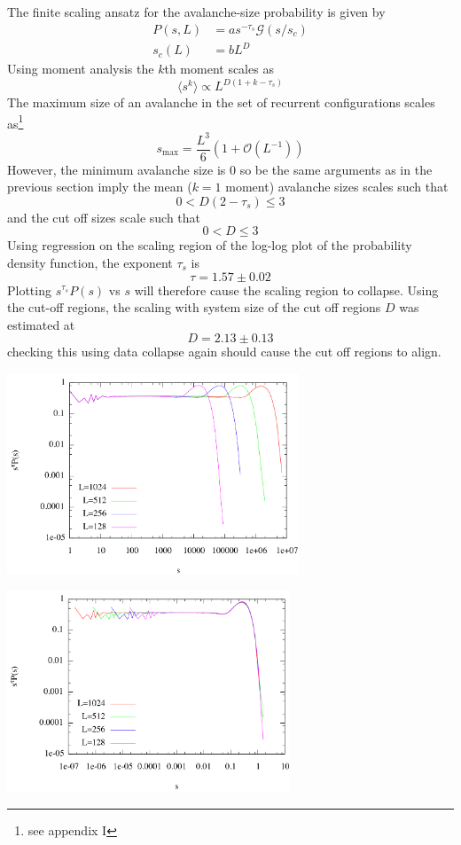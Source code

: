 \documentclass[twoside]{article}
\begin{document}
The finite scaling ansatz for the avalanche-size probability is given by 
\begin{align*}
P(s,L) &= a s^{-\tau_s} \mathcal{G} (s/s_c) \\ 
s_c (L ) &= b L^D
\end{align*}
Using moment analysis the $k$th moment scales as
\[
\langle s^k \rangle \propto L^{D(1+k-\tau_s)}
\]
The maximum size of an avalanche in the set of recurrent configurations scales as\footnote{see appendix I}
\[
s_{\text{max}} = \frac{L^3}{6} (1 + \mathcal{O} ( L^{-1}) )
\]
However, the minimum avalanche size is $0$ so be the same arguments as in the previous section imply the mean ($k=1$ moment) avalanche sizes scales such that
\[
0 < D(2-\tau_s )\leq 3
\]
and the cut off sizes scale such that
\[
0 < D \leq 3
\]
Using regression on the scaling region of the log-log plot of the probability density function, the exponent $\tau_s$ is
\[
\tau=1.57 \pm 0.02
\]
Plotting $s^{\tau_s} P(s)$ vs $s$ will therefore cause the scaling region to collapse.
Using the cut-off regions, the scaling with system size of the cut off regions $D$ was estimated at
\[
D=2.13 \pm 0.13
\]
checking this using data collapse again should cause the cut off regions to align.
\begin{multicols}{2}
\begin{center}
  \includegraphics[height=60mm]{pvsblc1.png}
\end{center}
\begin{center}
  \includegraphics[height=60mm]{pvsblc2.png}
\end{center}
\end{multicols}
\end{document}
